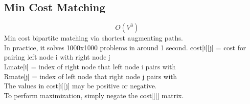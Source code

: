 \documentclass[11pt, oneside]{article}
\begin{document}
\subsection{Min Cost Matching}
\[O(V^3)\]
Min cost bipartite matching via shortest augmenting paths.\\
In practice, it solves 1000x1000 problems in around 1 second.
  cost[i][j] = cost for pairing left node i with right node j\\
  Lmate[i] = index of right node that left node i pairs with\\
  Rmate[j] = index of left node that right node j pairs with\\
The values in cost[i][j] may be positive or negative.\\
To perform maximization, simply negate the cost[][] matrix.\\
\end{document}
